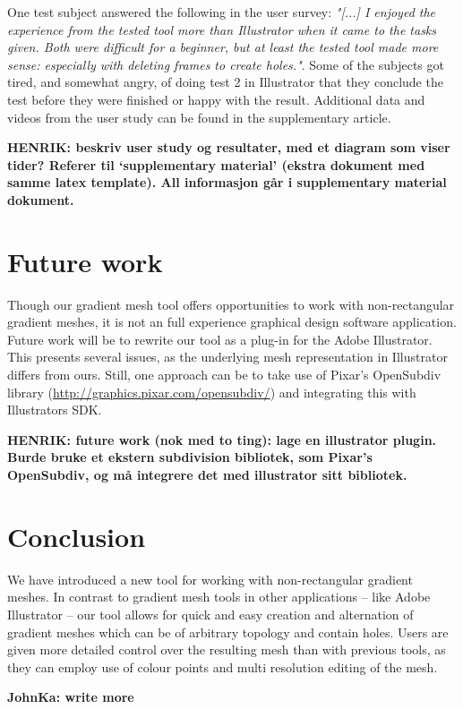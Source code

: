 \documentclass{egpubl}
\newcommand{\note}[3]{{\color{#2}\textbf{#1: #3}}}
\newcommand{\henrik}[1]{\note{HENRIK}{WildStrawberry}{#1}}
\newcommand{\john}[1]{\note{JohnKa}{ForestGreen}{#1}}
\begin{document}
One test subject answered the following in the user survey: \textit{"[...] I enjoyed the experience from the tested tool more than Illustrator when it came to the tasks given. Both were difficult for a beginner, but at least the tested tool made more sense: especially with deleting frames to create holes."}. Some of the subjects got tired, and somewhat angry, of doing test 2 in Illustrator that they conclude the test before they were finished or happy with the result. Additional data and videos from the user study can be found in the supplementary article. 

\henrik{beskriv user study og resultater, med et diagram som viser tider? Referer til `supplementary material' (ekstra dokument med samme latex template). All informasjon går i supplementary material dokument.}

\section{Future work}
\label{sec:FW}

Though our gradient mesh tool offers opportunities to work with non-rectangular gradient meshes, it is not an full experience graphical design software application. Future work will be to rewrite our tool as a plug-in for the Adobe Illustrator. This presents several issues, as the underlying mesh representation in Illustrator differs from ours. Still, one approach can be to take use of Pixar's OpenSubdiv library (\url{http://graphics.pixar.com/opensubdiv/}) and integrating this with Illustrators SDK.

\henrik{future work (nok med to ting): lage en illustrator plugin. Burde bruke et ekstern subdivision bibliotek, som Pixar's OpenSubdiv, og må integrere det med illustrator sitt bibliotek.}

\section{Conclusion}

We have introduced a new tool for working with non-rectangular gradient meshes. In contrast to gradient mesh tools in other applications -- like Adobe Illustrator -- our tool allows for quick and easy creation and alternation of gradient meshes which can be of arbitrary topology and contain holes. Users are given more detailed control over the resulting mesh than with previous tools, as they can employ use of colour points and multi resolution editing of the mesh.

\john{write more}




\end{document}
